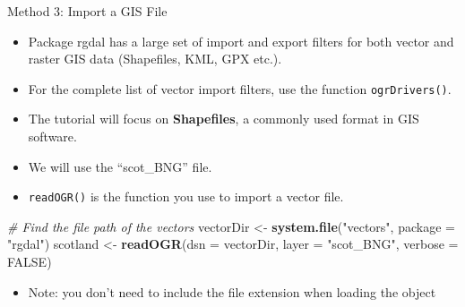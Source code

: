 \documentclass[10pt,ignorenonframetext,]{beamer}
\newenvironment{Shaded}{\begin{snugshade}}{\end{snugshade}}
\newcommand{\KeywordTok}[1]{\textcolor[rgb]{0.13,0.29,0.53}{\textbf{{#1}}}}
\newcommand{\DataTypeTok}[1]{\textcolor[rgb]{0.13,0.29,0.53}{{#1}}}
\newcommand{\StringTok}[1]{\textcolor[rgb]{0.31,0.60,0.02}{{#1}}}
\newcommand{\CommentTok}[1]{\textcolor[rgb]{0.56,0.35,0.01}{\textit{{#1}}}}
\newcommand{\OtherTok}[1]{\textcolor[rgb]{0.56,0.35,0.01}{{#1}}}
\newcommand{\NormalTok}[1]{{#1}}
\providecommand{\tightlist}{%
  \setlength{\itemsep}{0pt}\setlength{\parskip}{0pt}}
\begin{document}
\begin{frame}[fragile]{Method 3: Import a GIS File}

\begin{itemize}
\tightlist
\item
  Package \alert{rgdal} has a large set of import and export filters for
  both vector and raster GIS data (Shapefiles, KML, GPX etc.).
\item
  For the complete list of vector import filters, use the function
  \texttt{ogrDrivers()}.
\item
  The tutorial will focus on \textbf{Shapefiles}, a commonly used format
  in GIS software.
\item
  We will use the ``scot\_BNG'' file.
\item
  \texttt{readOGR()} is the function you use to import a vector file.
\end{itemize}

\begin{Shaded}
\begin{Highlighting}[]
\CommentTok{# Find the file path of the vectors}
\NormalTok{vectorDir <-}\StringTok{ }\KeywordTok{system.file}\NormalTok{(}\StringTok{"vectors"}\NormalTok{, }\DataTypeTok{package =} \StringTok{"rgdal"}\NormalTok{)}
\NormalTok{scotland <-}\StringTok{ }\KeywordTok{readOGR}\NormalTok{(}\DataTypeTok{dsn =} \NormalTok{vectorDir, }\DataTypeTok{layer =} \StringTok{"scot_BNG"}\NormalTok{, }
    \DataTypeTok{verbose =} \OtherTok{FALSE}\NormalTok{)}
\end{Highlighting}
\end{Shaded}

\begin{itemize}
\tightlist
\item
  Note: you don't need to include the file extension when loading the
  object
\end{itemize}

\end{frame}
\end{document}

